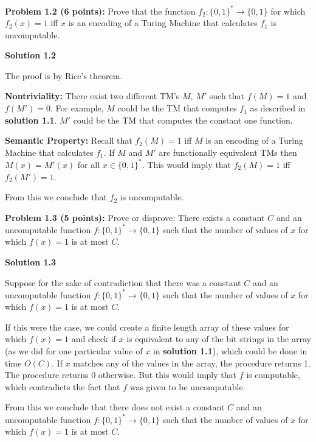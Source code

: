\documentclass[11pt]{article}
\begin{document}
\newpage

\textbf{Problem 1.2 (6 points):} Prove that the function $f_2:\{0,1\}^* \to \{0,1\}$ for which $f_2(x) = 1$ iff $x$ is an encoding of a Turing Machine that calculates $f_1$ is uncomputable.

\textbf{Solution 1.2}

The proof is by Rice's theorem.

\textbf{Nontriviality:} There exist two different TM's $M$, $M'$ such that $f(M) = 1$ and $f(M') = 0$. For example, $M$ could be the TM that computes $f_1$ as described in \textbf{solution 1.1}. $M'$ could be the TM that computes the constant one function. 

\textbf{Semantic Property:} Recall that $f_2(M) = 1$ iff $M$ is an encoding of a Turing Machine that calculates $f_1$. If $M$ and $M'$ are functionally equivalent TMs then $M(x) = M'(x)$ for all $x \in \{0, 1\}^*$. This would imply that $f_2(M) = 1$ iff $f_2(M') = 1$.

From this we conclude that $f_2$ is uncomputable.

\newpage

\textbf{Problem 1.3 (5 points):} Prove or disprove: There exists a constant $C$ and an uncomputable function $f:\{0,1\}^* \to \{0,1\}$ such that the number of values of $x$ for which $f(x)=1$ is at most $C$. %

\textbf{Solution 1.3}

Suppose for the sake of contradiction that there was a constant $C$ and an uncomputable function $f:\{0,1\}^* \to \{0,1\}$ such that the number of values of $x$ for which $f(x)=1$ is at most $C$. %

If this were the case, we could create a finite length array of these values for which $f(x) = 1$ and check if $x$ is equivalent to any of the bit strings in the array (as we did for one particular value of $x$ in \textbf{solution 1.1}), which could be done in time $O(C)$. If $x$ matches any of the values in the array, the procedure returns 1. The procedure returns 0 otherwise. But this would imply that $f$ is computable, which contradicts the fact that $f$ was given to be uncomputable.

From this we conclude that there does not exist a constant $C$ and an uncomputable  function $f:\{0,1\}^* \to \{0,1\}$ such that the number of values of $x$ for which $f(x)=1$ is at most $C$.

\newpage
\end{document}
